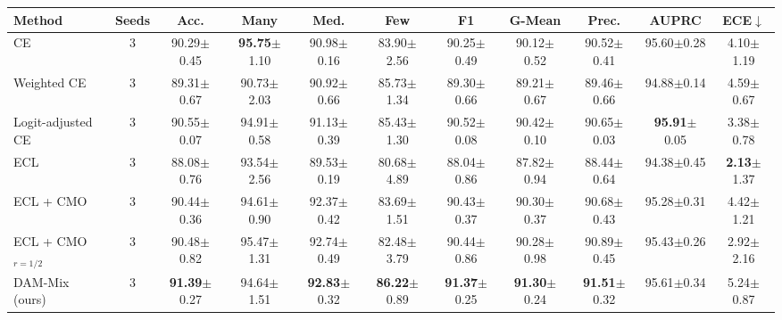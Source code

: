 \begin{tabular}{l c ccccccccc}
\toprule
Method & Seeds & Acc. & Many & Med. & Few & F1 & G-Mean & Prec. & AUPRC & ECE$\downarrow$ \\
\midrule
CE & 3 & 90.29{\scriptsize$\pm$0.45} & \textbf{95.75}{\scriptsize$\pm$1.10} & 90.98{\scriptsize$\pm$0.16} & 83.90{\scriptsize$\pm$2.56} & 90.25{\scriptsize$\pm$0.49} & 90.12{\scriptsize$\pm$0.52} & 90.52{\scriptsize$\pm$0.41} & 95.60{\scriptsize$\pm$0.28} & 4.10{\scriptsize$\pm$1.19} \\
Weighted CE & 3 & 89.31{\scriptsize$\pm$0.67} & 90.73{\scriptsize$\pm$2.03} & 90.92{\scriptsize$\pm$0.66} & 85.73{\scriptsize$\pm$1.34} & 89.30{\scriptsize$\pm$0.66} & 89.21{\scriptsize$\pm$0.67} & 89.46{\scriptsize$\pm$0.66} & 94.88{\scriptsize$\pm$0.14} & 4.59{\scriptsize$\pm$0.67} \\
Logit-adjusted CE & 3 & 90.55{\scriptsize$\pm$0.07} & 94.91{\scriptsize$\pm$0.58} & 91.13{\scriptsize$\pm$0.39} & 85.43{\scriptsize$\pm$1.30} & 90.52{\scriptsize$\pm$0.08} & 90.42{\scriptsize$\pm$0.10} & 90.65{\scriptsize$\pm$0.03} & \textbf{95.91}{\scriptsize$\pm$0.05} & 3.38{\scriptsize$\pm$0.78} \\
ECL & 3 & 88.08{\scriptsize$\pm$0.76} & 93.54{\scriptsize$\pm$2.56} & 89.53{\scriptsize$\pm$0.19} & 80.68{\scriptsize$\pm$4.89} & 88.04{\scriptsize$\pm$0.86} & 87.82{\scriptsize$\pm$0.94} & 88.44{\scriptsize$\pm$0.64} & 94.38{\scriptsize$\pm$0.45} & \textbf{2.13}{\scriptsize$\pm$1.37} \\
ECL + CMO & 3 & 90.44{\scriptsize$\pm$0.36} & 94.61{\scriptsize$\pm$0.90} & 92.37{\scriptsize$\pm$0.42} & 83.69{\scriptsize$\pm$1.51} & 90.43{\scriptsize$\pm$0.37} & 90.30{\scriptsize$\pm$0.37} & 90.68{\scriptsize$\pm$0.43} & 95.28{\scriptsize$\pm$0.31} & 4.42{\scriptsize$\pm$1.21} \\
ECL + CMO$_{r=1/2}$ & 3 & 90.48{\scriptsize$\pm$0.82} & 95.47{\scriptsize$\pm$1.31} & 92.74{\scriptsize$\pm$0.49} & 82.48{\scriptsize$\pm$3.79} & 90.44{\scriptsize$\pm$0.86} & 90.28{\scriptsize$\pm$0.98} & 90.89{\scriptsize$\pm$0.45} & 95.43{\scriptsize$\pm$0.26} & 2.92{\scriptsize$\pm$2.16} \\
\midrule
DAM-Mix (ours) & 3 & \textbf{91.39}{\scriptsize$\pm$0.27} & 94.64{\scriptsize$\pm$1.51} & \textbf{92.83}{\scriptsize$\pm$0.32} & \textbf{86.22}{\scriptsize$\pm$0.89} & \textbf{91.37}{\scriptsize$\pm$0.25} & \textbf{91.30}{\scriptsize$\pm$0.24} & \textbf{91.51}{\scriptsize$\pm$0.32} & 95.61{\scriptsize$\pm$0.34} & 5.24{\scriptsize$\pm$0.87} \\
\bottomrule
\end{tabular}

